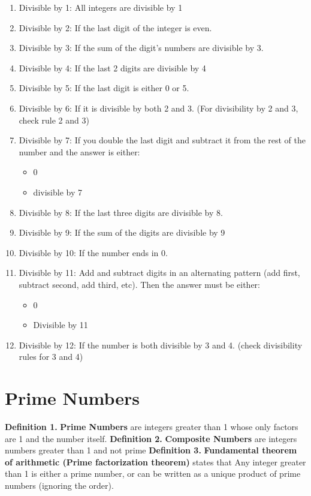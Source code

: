 \documentclass{report}
\begin{document}
    \begin{enumerate}
        \item Divisible by 1: All integers are divisible by 1
        \item Divisible by 2: If the last digit of the integer is even.
        \item Divisible by 3: If the sum of the digit’s numbers are divisible by 3.
        \item Divisible by 4: If the last 2 digits are divisible by 4
        \item Divisible by 5: If the last digit is either 0 or 5.
        \item Divisible by 6: If it is divisible by both 2 and 3. (For divisibility by 2 and 3, check rule 2 and 3)
        \item Divisible by 7:  If you double the last digit and subtract it from the rest of the number and the answer is either:
        \begin{itemize}
            \item 0
            \item divisible by 7
        \end{itemize}
        \item Divisible by 8:  If the last three digits are divisible by 8.
        \item Divisible by 9: If the sum of the digits are divisible by 9
        \item Divisible by 10: If the number ends in 0.
        \item Divisible by 11:  Add and subtract digits in an alternating pattern (add first, subtract second, add third, etc). Then the answer must be either:
            \begin{itemize}
                \item 0 
                \item Divisible by 11
            \end{itemize}
        \item Divisible by 12:  If the number is both divisible by 3 and 4. (check divisibility rules for 3 and 4)
    \end{enumerate}

    \bigbreak \noindent \bigbreak \noindent 
    \section{\LARGE Prime Numbers}
    \bigbreak \noindent 
    \textbf{Definition 1.}  \textbf{Prime Numbers} are integers greater than 1 whose only factors are 1 and the number itself.
   \bigbreak \noindent 
   \textbf{Definition 2.}    \textbf{Composite Numbers} are integers numbers greater than 1 and not prime
   \bigbreak \noindent 
   \textbf{Definition 3.} \textbf{Fundamental theorem of arithmetic (Prime factorization theorem)} states that Any integer greater than 1 is either a prime number, or can be written as a unique product of prime numbers (ignoring the order).
\end{document}
